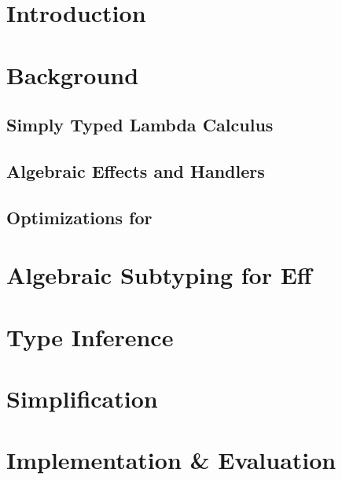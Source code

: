 \documentclass[master=cws, masteroption=ai]{kulemt}
\begin{document}
\listoffigures

\mainmatter

\chapter{Introduction}


\chapter{Background}\label{background}
  \section{Simply Typed Lambda Calculus}\label{lambda-calculus}
  

  \section{Algebraic Effects and Handlers}\label{eff-chapter}
  
  
  

  \section{Optimizations for \eff}
  

\chapter{Algebraic Subtyping for Eff}\label{core}






\chapter{Type Inference}\label{type-inference}




\chapter{Simplification}\label{simplification}


\chapter{Implementation \& Evaluation}\label{implementation}


\end{document}

